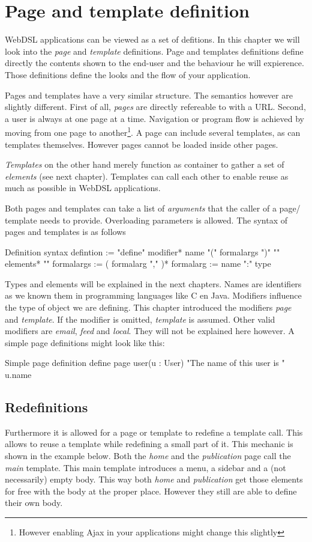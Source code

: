 \chapter{Page and template definition}
WebDSL applications can be viewed as a set of defitions. In this chapter we will look into the \emph{page} and \emph{template} definitions. Page and templates definitions define directly the contents shown to the end-user and the behaviour he will expierence. Those definitions define the looks and the flow of your application. 

Pages and templates have a very similar structure. The semantics however are slightly different. First of all, \emph{pages} are directly refereable to with a URL. Second, a user is always at one page at a time. Navigation or program flow is achieved by moving from one page to another\footnote{However enabling Ajax in your applications might change this slightly}. A page can include several templates, as can templates themselves. However pages cannot be loaded inside other pages. 

\emph{Templates} on the other hand merely function as container to gather a set of \emph{elements} (see next chapter). Templates can call each other to enable reuse as much as possible in WebDSL applications. 

Both pages and templates can take a list of \emph{arguments} that the caller of a page/ template needs to provide. Overloading parameters is allowed. The syntax of pages and templates is as follows
\begin{webdsl}{Definition syntax}
defintion 	:= "define" modifier* name "(" formalargs ")" "{" elements* "}"
formalargs 	:= ( formalarg "," )*
formalarg		:= name ":" type
\end{webdsl}
Types and elements will be explained in the next chapters. Names are identifiers as we known them in programming languages like C en Java. Modifiers influence the type of object we are defining. This chapter introduced the modifiers \emph{page} and \emph{template}. If the modifier is omitted, \emph{template} is assumed. Other valid modifiers are \emph{email}, \emph{feed} and \emph{local}. They will not be explained here however. A simple page definitions might look like this:
\begin{webdsl}{Simple page definition}
define page user(u : User) {
	"The name of this user is " u.name
}
\end{webdsl}

\section{Redefinitions}
Furthermore it is allowed for a page or template to redefine a template call. This allows to reuse a template while redefining a small part of it. This mechanic is shown in the example below. Both the \emph{home} and the \emph{publication} page call the \emph{main} template. This main template introduces a menu, a sidebar and a (not necessarily) empty body. This way both \emph{home} and \emph{publication} get those elements for free with the body at the proper place. However they still are able to define their own body. 

